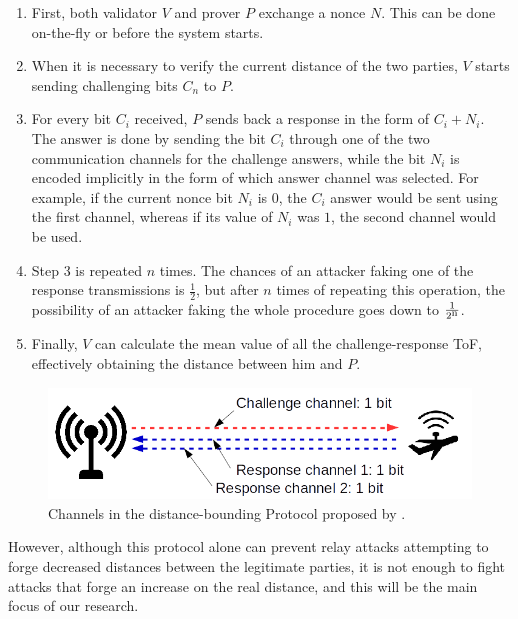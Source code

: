 \documentclass{article}
\begin{document}
\begin{enumerate}
  \item First, both validator $V$ and prover $P$ exchange a nonce $N$. This can be done on-the-fly or before the system starts.
  \item When it is necessary to verify the current distance of the two parties, $V$ starts sending challenging bits $C_{n}$ to $P$.
  \item For every bit $C_{i}$ received, $P$ sends back a response in the form of $C_{i}+N_{i}$. The answer is done by sending the bit $C_{i}$ through one of the two communication channels for the challenge answers, while the bit $N_{i}$ is encoded implicitly in the form of which answer channel was selected. For example, if the current nonce bit $N_{i}$ is $0$, the $C_{i}$ answer would be sent using the first channel, whereas if its value of $N_{i}$ was $1$, the second channel would be used.
  \item Step 3 is repeated $n$ times. The chances of an attacker faking one of the response transmissions is $\frac{1}{2}$, but after $n$ times of repeating this operation, the possibility of an attacker faking the whole procedure goes down to $\frac{1}{2\textsuperscript{n}}$. 
  \item Finally, $V$ can calculate the mean value of all the challenge-response ToF, effectively obtaining the distance between him and $P$.
\end{enumerate}




\begin{figure}[h!]
  \centering
    \includegraphics[width=1\textwidth]{images/dbounding.png}
  \caption{Channels in the distance-bounding Protocol proposed by \citeauthor{rasmussen2010realization}.}
  \label{fig:dbounding1}
\end{figure}



However, although this protocol alone can prevent relay attacks attempting to forge decreased distances between the legitimate parties, it is not enough to fight attacks that forge an increase on the real distance, and this will be the main focus of our research.\\
\end{document}
